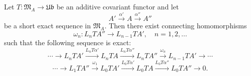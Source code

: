 Let $T: \mathfrak{M}_A \rightarrow \mathfrak{Ub}$ be an additive covariant functor and let
$$A' \xrightarrow{\alpha'} A \xrightarrow{\alpha''} A''$$
be a short exact sequence in $\mathfrak{M}_A$. Then there exist connecting homomorphisms
$$\omega_n: L_n T A'' \rightarrow L_{n-1} T A', \quad n = 1, 2, \ldots$$
such that the following sequence is exact:
$$\cdots \rightarrow L_n T A' \xrightarrow{L_n T \alpha'} L_n T A \xrightarrow{L_n T \alpha''} L_n T A'' \xrightarrow{\omega_n} L_{n-1} T A' \rightarrow \cdots$$
$$\cdots \rightarrow L_1 T A'' \xrightarrow{\omega_1} L_0 T A' \xrightarrow{L_0 T \alpha'} L_0 T A \xrightarrow{L_0 T \alpha''} L_0 T A'' \rightarrow 0.$$
